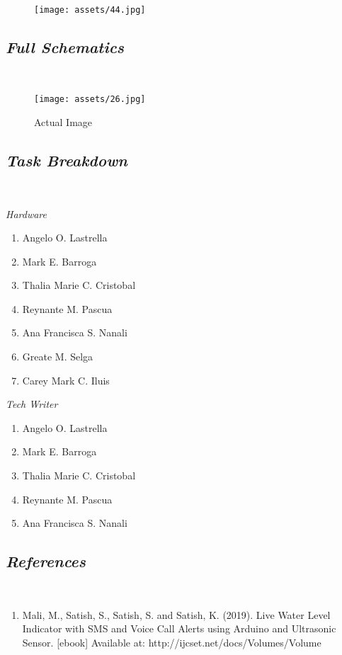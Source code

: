 \documentclass[11pt]{article}
\begin{document}
{\begin{figure}[H] 
\centering
\texttt{[image: assets/44.jpg]}
\caption{}
\end{figure}
  

\subsection{\emph{Full Schematics}}\

\begin{figure}[H] 
\centering
\texttt{[image: assets/26.jpg]}
\caption{Actual Image}
\end{figure}

\subsection{\emph{Task Breakdown}}\

{\emph{Hardware}
\begin{enumerate}
\item Angelo O. Lastrella 
\item  Mark E. Barroga 
\item Thalia Marie C. Cristobal 
\item Reynante M. Pascua 
\item Ana Francisca S. Nanali 
\item Greate M. Selga 
\item Carey Mark C. Iluis 
\end{enumerate}

{\emph{Tech Writer}
\begin{enumerate}
\item Angelo O. Lastrella 
\item Mark E. Barroga 
\item Thalia Marie C. Cristobal 
\item Reynante M. Pascua 
\item Ana Francisca S. Nanali 
\end{enumerate}

\subsection{\emph{References}}\
\begin{enumerate}
\item Mali, M., Satish, S., Satish, S. and Satish, K. (2019). Live Water Level Indicator with SMS and Voice Call Alerts using Arduino and Ultrasonic Sensor. [ebook] Available at: http://ijcset.net/docs/Volumes/Volume%


\end{enumerate}}}}
\end{document}
